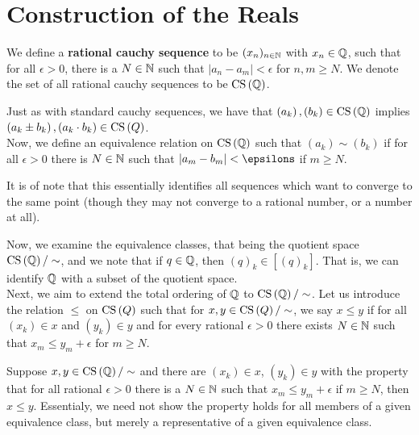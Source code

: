 \section{Construction of the Reals}
\begin{definition}
	We define a \textbf{rational cauchy sequence} to be \((x_n)_{n\in\mathbb{N}}\) with \(x_{n} \in \mathbb{Q}\), such that for all \(\epsilon > 0\), there is a \(N \in \mathbb{N}\) such that \(\left| a_{n} - a_{m} \right| < \epsilon\) for \(n, m \ge N\). We denote the set of all rational cauchy sequences to be \(\operatorname{CS} \left( \mathbb{Q} \right) \).
\end{definition}
Just as with standard cauchy sequences, we have that \(\left( a_{k} \right) , \left( b_{k} \right) \in \operatorname{CS}\left( \mathbb{Q} \right) \) implies \(\left( a_{k} \pm b_{k} \right) , \left( a_{k} \cdot b_{k} \right) \in \operatorname{CS}\left( Q \right)  \).
\\ Now, we define an equivalence relation on \(\operatorname{CS}\left( \mathbb{Q} \right) \) such that \(\left( a_{k} \right) \sim \left( b_{k} \right) \) if for all \(\epsilon > 0\) there is \(N \in \mathbb{N}\) such that \(\left| a_{m} - b_{m} \right| < \epsilons\) if \(m\ge N\).\\
\begin{remark}
	It is of note that this essentially identifies all sequences which want to converge to the same point (though they may not converge to a rational number, or a number at all).
\end{remark}
Now, we examine the equivalence classes, that being the quotient space \(\operatorname{CS} \left( \mathbb{Q} \right) / \sim\), and we note that if \(q \in \mathbb{Q}\), then \(\left( q \right) _{k} \in \left[ \left( q \right) _{k} \right] \). That is, we can identify \(\mathbb{Q}\) with a subset of the quotient space.
\\ Next, we aim to extend the total ordering of \(\mathbb{Q}\) to \(\operatorname{CS}\left( \mathbb{Q} \right) / \sim \). Let us introduce the relation \(\leqslant\) on \(\operatorname{CS}\left( Q \right) \) such that for \(x, y \in \operatorname{CS}\left( Q \right) / \sim\), we say \(x \leqslant y\) if for all \(\left( x_{k} \right) \in x\) and \(\left( y_{k} \right) \in y\) and for every rational \(\epsilon > 0\) there exists \(N \in \mathbb{N}\) such that \(x_{m} \leq y_{m} + \epsilon\) for \(m \ge N\).
\begin{proposition}
	Suppose \(x, y \in \operatorname{CS} \left( \mathbb{Q} \right) / \sim\) and there are \(\left( x_{k} \right) \in x\), \(\left( y_{k} \right) \in y\) with the property that for all rational \(\epsilon > 0\) there is a \(N \in \mathbb{N}\) such that \(x_{m}\le y_{m} + \epsilon\) if \(m\ge N\), then \(x \leqslant y\). Essentialy, we need not show the property holds for all members of a given equivalence class, but merely a representative of a given equivalence class.
\end{proposition}
